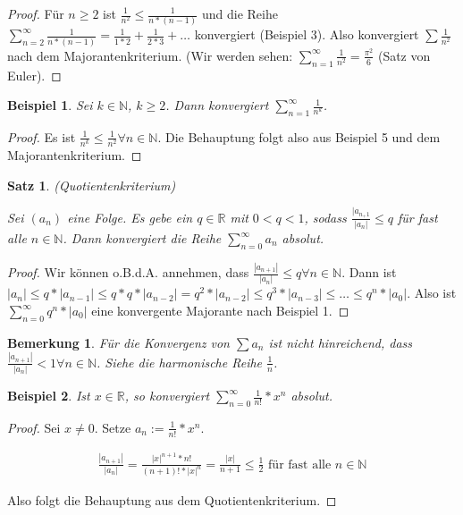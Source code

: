 \documentclass[a4paper,10pt]{article}
\newtheorem{notice}{Bemerkung}
\newtheorem{example}{Beispiel}
\newtheorem{satz}{Satz}
\begin{document}
\begin{proof}
 Für $n \ge 2$ ist $\frac{1}{n^2} \le \frac{1}{n * (n - 1)}$ und die Reihe $\sum_{n = 2}^\infty \frac{1}{n * (n - 1)} = \frac{1}{1 * 2} + \frac{1}{2 * 3} + \dots$ konvergiert (Beispiel 3).
 Also konvergiert $\sum \frac{1}{n^2}$ nach dem Majorantenkriterium.
 (Wir werden sehen: $\sum_{n = 1}^\infty \frac{1}{n^2} = \frac{\pi^2}{6}$ (Satz von Euler).
\end{proof}

\begin{example}
 Sei $k \in \mathbb{N}$, $k \ge 2$.
 Dann konvergiert $\sum_{n = 1}^\infty \frac{1}{n^k}$.
\end{example}

\begin{proof}
 Es ist $\frac{1}{n^k} \le \frac{1}{n^2} \forall n \in \mathbb{N}$.
 Die Behauptung folgt also aus Beispiel 5 und dem Majorantenkriterium.
\end{proof}

\begin{satz}
 (Quotientenkriterium)
 
 Sei $(a_n)$ eine Folge.
 Es gebe ein $q \in \mathbb{R}$ mit $0 < q < 1$, sodass $\frac{|a_{n_ + 1}}{|a_n|} \le q$ für fast alle $n \in \mathbb{N}$.
 Dann konvergiert die Reihe $\sum_{n = 0}^\infty a_n$ absolut.
\end{satz}

\begin{proof}
 Wir können o.B.d.A. annehmen, dass $\frac{|a_{n + 1}|}{|a_n|} \le q \forall n \in \mathbb{N}$.
 Dann ist $|a_n| \le q * |a_{n - 1}| \le q * q * |a_{n - 2}| = q^2 * |a_{n - 2}| \le q^3 * |a_{n - 3}| \le \dots \le q^n * |a_0|$.
 Also ist $\sum_{n = 0}^\infty q^n * |a_0|$ eine konvergente Majorante nach Beispiel 1.
\end{proof}

\begin{notice}
 Für die Konvergenz von $\sum a_n$ ist nicht hinreichend, dass $\frac{|a_{n + 1}|}{|a_n|} < 1 \forall n \in \mathbb{N}$.
 Siehe die harmonische Reihe $\frac{1}{n}$.
\end{notice}

\begin{example}
 Ist $x \in \mathbb{R}$, so konvergiert $\sum_{n = 0}^\infty \frac{1}{n!} * x^n$ absolut.
\end{example}

\begin{proof}
 Sei $x \ne 0$.
 Setze $a_n := \frac{1}{n!} * x^n$.
 
 \begin{align*}
  \frac{|a_{n + 1}|}{|a_n|} = \frac{|x|^{n + 1} * n!}{(n + 1)! * |x|^n} = \frac{|x|}{n + 1} \le \frac{1}{2} \text{ für fast alle } n \in \mathbb{N}
 \end{align*}

 Also folgt die Behauptung aus dem Quotientenkriterium.
\end{proof}
\end{document}
